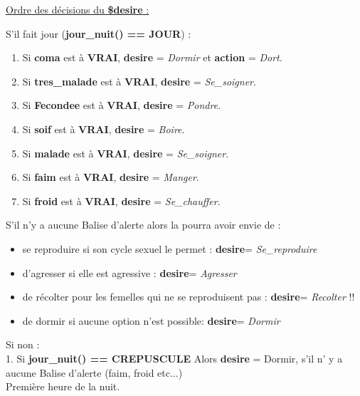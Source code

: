 \documentclass[french]{report}
\newlength{\du}\fi
\begin{document}
\begin{center}
	\underline{Ordre des décisions du \textbf{\$desire} : }
\end{center}
S'il fait jour (\textbf{jour\_nuit() == JOUR}) :\\
\begin{enumerate}
	\item Si \textbf{coma} est à \textbf{VRAI}, \textbf{desire} = \textit{Dormir} et \textbf{action} = \textit{Dort}.
	\item Si \textbf{tres\_malade} est à \textbf{VRAI}, \textbf{desire} = \textit{Se\_soigner}.
	\item Si \textbf{Fecondee} est à \textbf{VRAI}, \textbf{desire} = \textit{Pondre}.
	\item Si \textbf{soif} est à \textbf{VRAI}, \textbf{desire} = \textit{Boire}.
	\item Si \textbf{malade} est à \textbf{VRAI}, \textbf{desire} = \textit{Se\_soigner}.
	\item Si \textbf{faim} est à \textbf{VRAI}, \textbf{desire} = \textit{Manger}.
	\item Si \textbf{froid} est à \textbf{VRAI}, \textbf{desire} = \textit{Se\_chauffer}.
\end{enumerate}

S'il n'y a aucune Balise d'alerte alors la \CoCiX pourra avoir envie de : \\
\begin{itemize}
	\item se reproduire si son cycle sexuel le permet : 
	\textbf{desire}= \textit{Se\_reproduire} \\
	\item d'agresser si elle est agressive : 
	\textbf{desire}= \textit{Agresser} \\
	\item de récolter pour les femelles qui ne se reproduisent pas : 
	\textbf{desire}= \textit{Recolter} !!\\
	\item de dormir si aucune option n'est possible:
	\textbf{desire}= \textit{Dormir} \\
\end{itemize}
Si non :\\

1. Si \textbf{jour\_nuit() == CREPUSCULE}  Alors \textbf{desire}  = Dormir, s'il n' y a aucune Balise d'alerte (faim, froid etc...)\\
Première heure de la nuit.\\
\end{document}
